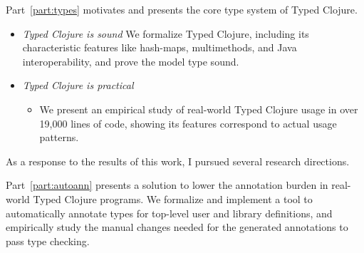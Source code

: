 Part~\ref{part:types} motivates and presents the core type system of Typed Clojure.

\begin{itemize}
  \item \emph{Typed Clojure is sound} We formalize Typed Clojure, including
    its characteristic features like hash-maps, multimethods, and Java interoperability,
    and prove the model type sound.
  \item \emph{Typed Clojure is practical} 
    \begin{itemize}
      \item We present an empirical study of real-world Typed Clojure usage
        in over 19,000 lines of code, showing its features correspond to actual usage patterns.
    \end{itemize}
\end{itemize}

As a response to the results of this work, I pursued several research directions.

Part~\ref{part:autoann} presents a solution to lower the annotation burden in real-world Typed Clojure programs.
We formalize and implement a tool to automatically annotate types for top-level
user and library definitions, and empirically study the manual changes needed for the generated annotations
to pass type checking.

